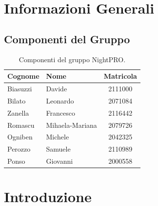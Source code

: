 \documentclass[a4paper, 11pt, oneside]{scrartcl} %
\begin{document}
\newpage
\tableofcontents 
\pagestyle{fancy} 

\newpage
\section*{Informazioni Generali}

\subsection*{Componenti del Gruppo}

\begin{table}[h!]
\centering
\renewcommand{\arraystretch}{1.2} 
\begin{tabular}{@{}llc@{}}
\toprule
\textbf{Cognome} & \textbf{Nome} & \textbf{Matricola} \\
\midrule
Biasuzzi & Davide & 2111000 \\
Bilato & Leonardo & 2071084 \\
Zanella & Francesco & 2116442 \\
Romascu & Mihaela-Mariana & 2079726 \\
Ogniben & Michele & 2042325 \\
Perozzo & Samuele & 2110989 \\
Ponso & Giovanni & 2000558 \\
\bottomrule
\end{tabular}
\caption{Componenti del gruppo NightPRO.}
\label{tab_fig_componenti_del_gruppo_nightpro}
\end{table}

\newpage
\section{Introduzione}
\end{document}
